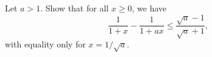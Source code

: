 \begin{exercise}
  \label{ex:hw07:rational-maximum}
  Let $a>1$. Show that for all $x\ge0$, we have
  \[
    \frac1{1+x}-\frac1{1+ax}\le\frac{\sqrt a-1}{\sqrt a+1},
  \]
  with equality only for $x=1/\sqrt a$.
\end{exercise}
